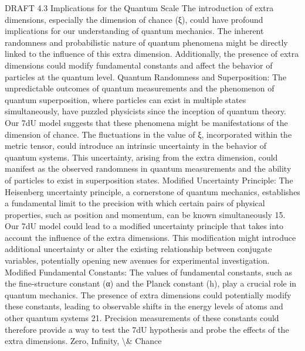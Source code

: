 \documentclass[12pt]{article}
\begin{document}
DRAFT
4.3 Implications for the Quantum Scale
The introduction of extra dimensions, especially the dimension of chance (ξ), could have
profound implications for our understanding of quantum mechanics. The inherent
randomness and probabilistic nature of quantum phenomena might be directly linked
to the inﬂuence of this extra dimension. Additionally, the presence of extra
dimensions could modify fundamental constants and aﬀect the behavior of particles
at the quantum level.
Quantum Randomness and Superposition:
The unpredictable outcomes of quantum measurements and the phenomenon of
quantum superposition, where particles can exist in multiple states simultaneously,
have puzzled physicists since the inception of quantum theory. Our 7dU model
suggests that these phenomena might be manifestations of the dimension of chance.
The ﬂuctuations in the value of ξ, incorporated within the metric tensor, could
introduce an intrinsic uncertainty in the behavior of quantum systems. This
uncertainty, arising from the extra dimension, could manifest as the observed
randomness in quantum measurements and the ability of particles to exist in
superposition states.
Modiﬁed Uncertainty Principle:
The Heisenberg uncertainty principle, a cornerstone of quantum mechanics, establishes
a fundamental limit to the precision with which certain pairs of physical properties,
such as position and momentum, can be known simultaneously 15. Our 7dU model
could lead to a modiﬁed uncertainty principle that takes into account the inﬂuence of
the extra dimensions. This modiﬁcation might introduce additional uncertainty or alter
the existing relationship between conjugate variables, potentially opening new
avenues for experimental investigation.
Modiﬁed Fundamental Constants:
The values of fundamental constants, such as the ﬁne-structure constant (α) and the
Planck constant (h), play a crucial role in quantum mechanics. The presence of extra
dimensions could potentially modify these constants, leading to observable shifts in
the energy levels of atoms and other quantum systems 21. Precision measurements
of these constants could therefore provide a way to test the 7dU hypothesis and
probe the eﬀects of the extra dimensions.
Zero, Infinity, \textbackslash{}& Chance
\end{document}
